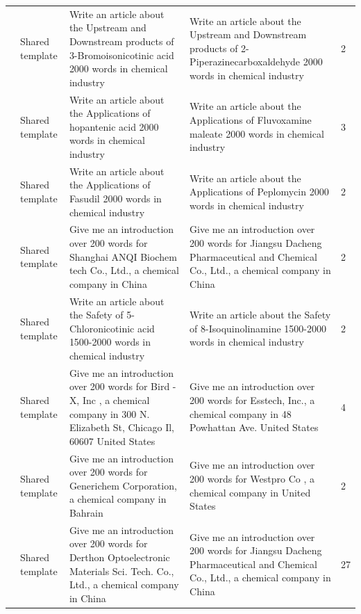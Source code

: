 {\begin{longtable}{@{}p{}p{}p{}p{}p{}@{}}
\addlinespace[3pt]
668 & Shared template & \raggedright Write an article about the Upstream and Downstream products of 3-Bromoisonicotinic acid 2000 words in chemical industry & \raggedright Write an article about the Upstream and Downstream products of 2-Piperazinecarboxaldehyde 2000 words in chemical industry & 2\\
\addlinespace[3pt]
670 & Shared template & \raggedright Write an article about the Applications of hopantenic acid 2000 words in chemical industry & \raggedright Write an article about the Applications of Fluvoxamine maleate 2000 words in chemical industry & 3\\
\addlinespace[3pt]
723 & Shared template & \raggedright Write an article about the Applications of Fasudil 2000 words in chemical industry & \raggedright Write an article about the Applications of Peplomycin 2000 words in chemical industry & 2\\
\addlinespace[3pt]
744 & Shared template & \raggedright Give me an introduction over 200 words for Shanghai ANQI Biochem tech Co., Ltd., a chemical company in China & \raggedright Give me an introduction over 200 words for Jiangsu Dacheng Pharmaceutical and Chemical Co., Ltd., a chemical company in China & 2\\
\addlinespace[3pt]
746 & Shared template & \raggedright Write an article about the Safety of 5-Chloronicotinic acid 1500-2000 words in chemical industry & \raggedright Write an article about the Safety of 8-Isoquinolinamine 1500-2000 words in chemical industry & 2\\
\addlinespace[3pt]
761 & Shared template & \raggedright Give me an introduction over 200 words for Bird - X, Inc , a chemical company in 300 N. Elizabeth St, Chicago Il, 60607 United States & \raggedright Give me an introduction over 200 words for Esstech, Inc., a chemical company in 48 Powhattan Ave. United States & 4\\
\addlinespace[3pt]
795 & Shared template & \raggedright Give me an introduction over 200 words for Generichem Corporation, a chemical company in Bahrain & \raggedright Give me an introduction over 200 words for Westpro Co , a chemical company in United States & 2\\
\addlinespace[3pt]
809 & Shared template & \raggedright Give me an introduction over 200 words for Derthon Optoelectronic Materials Sci. Tech. Co., Ltd., a chemical company in China & \raggedright Give me an introduction over 200 words for Jiangsu Dacheng Pharmaceutical and Chemical Co., Ltd., a chemical company in China & 27\\

\end{longtable}}
